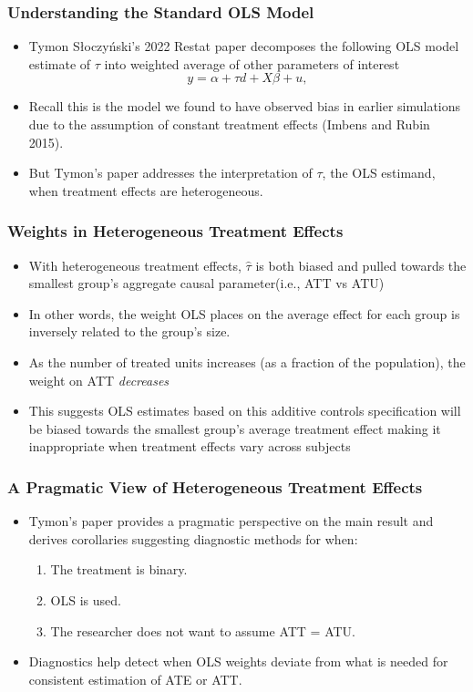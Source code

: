 \documentclass{beamer}
\begin{document}
\begin{frame}\frametitle{Understanding the Standard OLS Model}
\begin{itemize}
  \item Tymon S{\l}oczy\'nski's 2022 Restat paper decomposes the following OLS model estimate of $\tau$ into weighted average of other parameters of interest
    \begin{equation}
      y = \alpha + \tau d + X \beta + u,
    \end{equation}
  \item Recall this is the model we found to have observed bias in earlier simulations due to the assumption of constant treatment effects (Imbens and Rubin 2015).
  \item But Tymon's paper addresses the interpretation of \(\tau\), the OLS estimand, when treatment effects are heterogeneous.
\end{itemize}
\end{frame}




\begin{frame}
\frametitle{Weights in Heterogeneous Treatment Effects}
\begin{itemize}
  \item With heterogeneous treatment effects, $\widehat{\tau}$ is both biased and pulled towards the smallest group's aggregate causal parameter(i.e., ATT vs ATU)
  \item In other words, the weight OLS places on the average effect for each group is inversely related to the group's size.
  \item As the number of treated units increases (as a fraction of the population), the weight on ATT \emph{decreases}
  \item This suggests OLS estimates based on this additive controls specification will be biased towards the smallest group's average treatment effect making it inappropriate when treatment effects vary across subjects
\end{itemize}
\end{frame}


\begin{frame}
\frametitle{A Pragmatic View of Heterogeneous Treatment Effects}
\begin{itemize}
  \item Tymon's paper provides a pragmatic perspective on the main result and derives corollaries suggesting diagnostic methods for when:
    \begin{enumerate}
      \item The treatment is binary.
      \item OLS is used.
      \item The researcher does not want to assume ATT = ATU.
    \end{enumerate}
  \item Diagnostics help detect when OLS weights deviate from what is needed for consistent estimation of ATE or ATT.
\end{itemize}
\end{frame}
\end{document}
